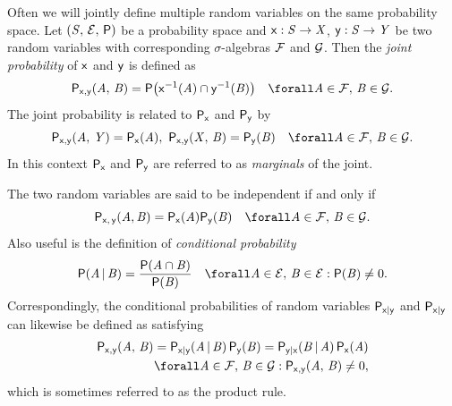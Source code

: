 Often we will jointly define multiple random variables on the same probability space. Let $(\mathit{S},\,\mathcal{E},\,\mathsf{P})$ be a probability space and $\mathsf{x} : \mathit{S} \to \mathit{X}$, $\mathsf{y} : \mathit{S} \to \mathit{Y}$ be two random variables with corresponding $\sigma$-algebras $\mathcal{F}$ and $\mathcal{G}$. Then the \emph{joint probability} of $\mathsf{x}$ and $\mathsf{y}$ is defined as
\begin{equation}\label{eq:joint-probability-rvar}
  \prob{\rvar{x},\rvar{y}}(\set{A},\,\set{B}) = 
  \probability\lpa \rvar{x}^{-1}(\set{A}) \cap \rvar{y}^{-1}(\set{B})\rpa
  \quad \forall \set{A} \in \sset{F},\,\set{B} \in \sset{G}.
\end{equation}
The joint probability is related to $\mathsf{P}_{\mathsf{x}}$ and $\mathsf{P}_{\mathsf{y}}$ by
\begin{equation}\label{eq:sum-rule-rvar}
  \prob{\rvar{x},\rvar{y}}(\set{A},\,\set{Y}) =
  \prob{\rvar{x}}(\set{A}),~
  \prob{\rvar{x},\rvar{y}}(\set{X},\,\set{B}) =
  \prob{\rvar{y}}(\set{B})
  \quad \forall \set{A} \in \sset{F},\,\set{B} \in \sset{G}.
\end{equation}
In this context $\mathsf{P}_{\mathsf{x}}$ and $\mathsf{P}_{\mathsf{y}}$ are referred to as \emph{marginals} of the joint.

The two random variables are said to be independent if and only if
\begin{equation}\label{eq:independent-rvars}
  \prob{\rvar{x},\,\rvar{y}}(\set{A},\set{B}) = \prob{\rvar{x}}(\set{A})\prob{\rvar{y}}(\set{B})
  \quad \forall \set{A} \in \sset{F},\,\set{B} \in \sset{G}.
\end{equation}
Also useful is the definition of \emph{conditional probability}
\begin{equation}\label{eq:conditional-probability}
  \probability(\set{A} \gvn \set{B}) =
  \frac{\probability(\set{A} \cap \set{B})}{\probability(\set{B})}
  \quad \forall \set{A} \in \sset{E},\,\set{B} \in \sset{E} : \probability(\set{B}) \neq 0.
\end{equation}
Correspondingly, the conditional probabilities of random variables $\mathsf{P}_{\mathsf{x}|\mathsf{y}}$ and $\mathsf{P}_{\mathsf{x}|\mathsf{y}}$ can likewise be defined as satisfying
\begin{equation}\label{eq:product-rule}
\begin{split}
  \prob{\rvar{x},\rvar{y}}(\set{A},\,\set{B}) =
  \prob{\rvar{x}|\rvar{y}}(\set{A} \gvn \set{B}) \, \prob{\rvar{y}}(\set{B}) =
  \prob{\rvar{y}|\rvar{x}}(\set{B} \gvn \set{A}) \, \prob{\rvar{x}}(\set{A})\\
  \forall \set{A} \in \sset{F},\,\set{B} \in \sset{G} : 
  \prob{\rvar{x},\rvar{y}}(\set{A},\,\set{B}) \neq 0,
\end{split}
\end{equation}
which is sometimes referred to as the product rule. 

